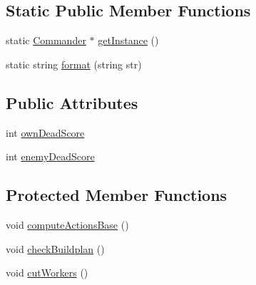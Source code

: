 \subsection*{Static Public Member Functions}
\begin{DoxyCompactItemize}
\item 
static \hyperlink{class_commander}{Commander} $\ast$ \hyperlink{class_commander_aa3c904019bf7e98fd843e2613a72bd07}{get\-Instance} ()
\item 
static string \hyperlink{class_commander_ac935c0f129b78a62fb03cc3e1a3bceac}{format} (string str)
\end{DoxyCompactItemize}
\subsection*{Public Attributes}
\begin{DoxyCompactItemize}
\item 
int \hyperlink{class_commander_a3691e42fa66318d12bc24462915f9786}{own\-Dead\-Score}
\item 
int \hyperlink{class_commander_a92767d5f0687dae52eb48ea1d7bcc7e1}{enemy\-Dead\-Score}
\end{DoxyCompactItemize}
\subsection*{Protected Member Functions}
\begin{DoxyCompactItemize}
\item 
void \hyperlink{class_commander_a4461cc2e604a0a3d5ebdcdd553511a4e}{compute\-Actions\-Base} ()
\item 
void \hyperlink{class_commander_a1ba5f150a489c9a3b8a7e9b39fec8f3b}{check\-Buildplan} ()
\item 
void \hyperlink{class_commander_a08b879c9422287446753b3dd486ff9a1}{cut\-Workers} ()
\end{DoxyCompactItemize}
